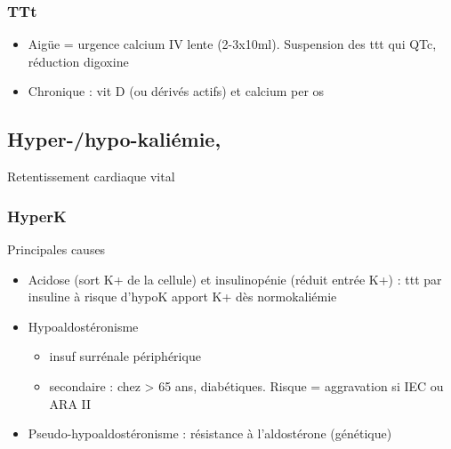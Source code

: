 \documentclass{book}
\begin{document}
\subsubsection{TTt}
\label{sec:org62353e2}
\begin{itemize}
\item Aigüe = urgence \faBomb \thus calcium IV lente (2-3x10ml). Suspension des ttt qui \inc
QTc, réduction digoxine
\item Chronique : vit D (ou dérivés actifs) et calcium per os
\end{itemize}

\subsection{Hyper-/hypo-kaliémie,}
\label{sec:org5ec16d2}
Retentissement cardiaque \thus vital \faBomb

\subsubsection{HyperK}
\label{sec:orgc99c318}
Principales causes
\begin{itemize}
\item Acidose (sort K+ de la cellule) et insulinopénie (réduit entrée K+) : ttt par
insuline à risque d'hypoK \danger \thus apport K+ dès normokaliémie
\item Hypoaldostéronisme
\begin{itemize}
\item insuf surrénale périphérique
\item secondaire : chez > 65 ans, diabétiques. Risque = aggravation si IEC ou ARA II
\end{itemize}
\item Pseudo-hypoaldostéronisme : résistance à l'aldostérone (génétique)
\end{itemize}
\end{document}

